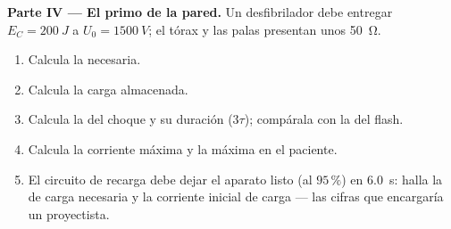 \begin{problem}
\medskip
\noindent\textbf{Parte IV --- El primo de la pared.}
Un desfibrilador debe entregar $E_C = \qty{200}{J}$ a $U_0 = \qty{1500}{V}$; el tórax
y las palas presentan unos \qty{50}{\ohm}.
\begin{enumerate}[resume]
  \item Calcula la  necesaria.
  \item Calcula la carga almacenada.
  \item Calcula la  del choque y su duración ($3\tau$); compárala
        con la del flash.
  \item Calcula la corriente máxima y la  máxima en el paciente.
  \item El circuito de recarga debe dejar el aparato listo (al $95\,\%$) en
        \qty{6.0}{s}: halla la  de carga necesaria y la corriente inicial
        de carga --- las cifras que encargaría un proyectista.
\end{enumerate}
\end{problem}
